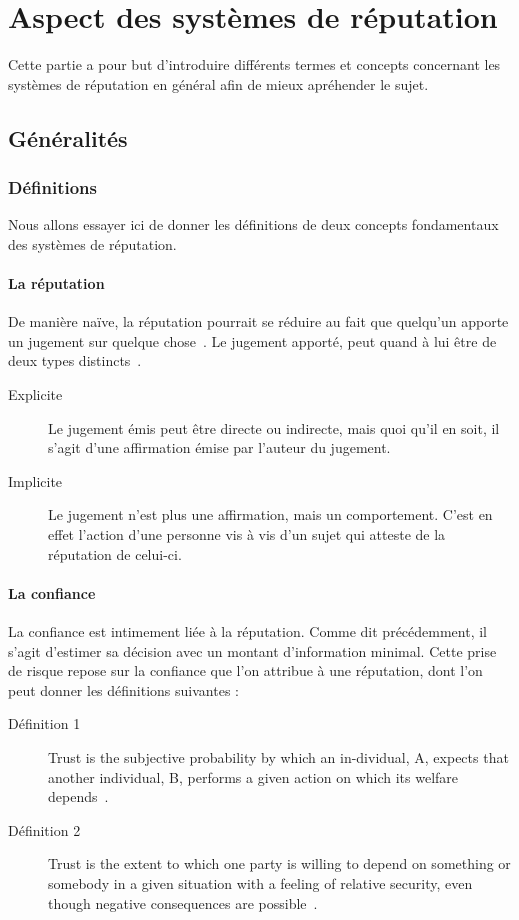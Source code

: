 \documentclass[a4paper, 11pt]{article} %
\begin{document}
\section{Aspect des systèmes de réputation}
Cette partie a pour but d'introduire différents termes et concepts concernant les systèmes de réputation en général afin de mieux apréhender le sujet.

\subsection{Généralités}
\subsubsection{Définitions}
Nous allons essayer ici de donner les définitions de deux concepts fondamentaux des systèmes de réputation.

\paragraph{La réputation}
De manière naïve, la réputation pourrait se réduire au fait que quelqu'un apporte un jugement sur quelque chose~\cite{FarmerGlass2010}.
Le jugement apporté, peut quand à lui être de deux types distincts~\cite{FarmerGlass2010}.
\begin{description}
	\item[Explicite] Le jugement émis peut être directe ou indirecte, mais quoi qu'il en soit, il s'agit d'une affirmation émise par l'auteur du jugement.
	\item[Implicite] Le jugement n'est plus une affirmation, mais un comportement. C'est en effet l'action d'une personne vis à vis d'un sujet qui atteste de la réputation de celui-ci.
\end{description}

\paragraph{La confiance}
La confiance est intimement liée à la réputation. Comme dit précédemment, il s'agit d'estimer sa décision avec un montant d'information minimal.
Cette prise de risque repose sur la confiance que l'on attribue à une réputation, dont l'on peut donner les définitions suivantes :
\begin{description}
	\item[Définition 1] Trust is the subjective probability by which an in-dividual, A, expects that another individual, B, performs a given action on which its welfare depends~\cite{JosangIsmailBoyd2007}.
	\item[Définition 2]Trust is the extent to which one party is willing to depend on something or somebody in a given situation with a feeling of relative security, even though negative consequences are possible~\cite{JosangIsmailBoyd2007}.
\end{description}
\end{document}

